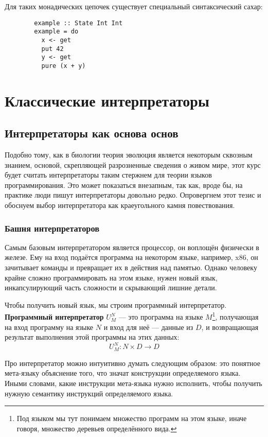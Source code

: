 \documentclass[12pt]{article}
\newcommand{\vocab}[1]{\textbf{#1}} %
\begin{document}
    Для таких монадических цепочек существует специальный синтаксический сахар:
    \begin{verbatim}
        example :: State Int Int
        example = do
          x <- get
          put 42
          y <- get
          pure (x + y)
    \end{verbatim}


    \section{Классические интерпретаторы}

    \subsection{Интерпретаторы как основа основ}

    Подобно тому, как в биологии теория эволюция является некоторым сквозным знанием, основой, скрепляющей разрозненные сведения о живом мире, этот курс будет считать интерпретаторы таким стержнем для теории языков программирования.
    Это может показаться внезапным, так как, вроде бы, на практике люди пишут интерпретаторы довольно редко.
    Опровергнем этот тезис и обоснуем выбор интерпретатора как краеугольного камня повествования.

    \subsubsection{Башня интерпретаторов}

    Самым базовым интерпретатором является процессор, он воплощён физически в железе.
    Ему на вход подаётся программа на некотором языке, например, x86, он зачитывает команды и превращает их в действия над памятью.
    Однако человеку крайне сложно программировать на этом языке, нужен новый язык, инкапсулирующий часть сложности и скрывающий лишние детали.

    Чтобы получить новый язык, мы строим программный интерпретатор.
    \vocab{Программный интерпретатор} $U_M^N$ --- это программа на языке $M$\footnote{Под языком мы тут понимаем множество программ на этом языке, иначе говоря, множество деревьев определённого вида.}, получающая на вход программу на языке $N$ и вход для неё --- данные из $D$, и возвращающая результат выполнения этой программы на этих данных: \[U_M^N : N\times D\to D\]

    Про интерпретатор можно интуитивно думать следующим образом: это понятное мета-языку объяснение того, что значат конструкции определяемого языка.
    Иными словами, какие инструкции мета-языка нужно исполнить, чтобы получить нужную семантику инструкций определяемого языка.
\end{document}
